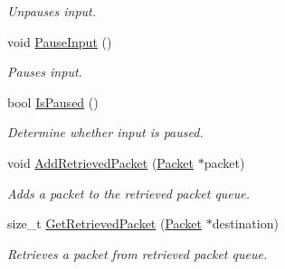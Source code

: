 \begin{DoxyCompactItemize}
\begin{DoxyCompactList}\small\item\em Unpauses input. \item\end{DoxyCompactList}\item 
void \hyperlink{class_sound_input_instance_a752a8f4dd8ae4937031d1d744b517a87}{PauseInput} ()
\begin{DoxyCompactList}\small\item\em Pauses input. \item\end{DoxyCompactList}\item 
bool \hyperlink{class_sound_input_instance_afebc047720f4266697154216b8b26976}{IsPaused} ()
\begin{DoxyCompactList}\small\item\em Determine whether input is paused. \item\end{DoxyCompactList}\item 
void \hyperlink{class_sound_input_instance_af69931bb00f7e8b94a4645feab35aeaa}{AddRetrievedPacket} (\hyperlink{class_packet}{Packet} $\ast$packet)
\begin{DoxyCompactList}\small\item\em Adds a packet to the retrieved packet queue. \item\end{DoxyCompactList}\item 
size\_\-t \hyperlink{class_sound_input_instance_aec79e733d195a0a5386ac1c5903ff446}{GetRetrievedPacket} (\hyperlink{class_packet}{Packet} $\ast$destination)
\begin{DoxyCompactList}\small\item\em Retrieves a packet from retrieved packet queue. \item\end{DoxyCompactList}\end{DoxyCompactItemize}
